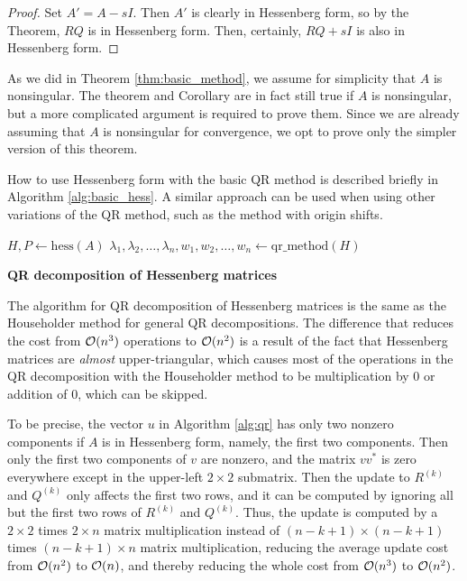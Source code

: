 \documentclass{article}
\begin{document}
\begin{proof}
	Set $A' = A -s I$. Then $A'$ is clearly in Hessenberg form, so by the Theorem, $RQ$ is in Hessenberg form. Then, certainly, $RQ +s I$ is also in Hessenberg form.
\end{proof}
\begin{remark}
	As we did in Theorem \ref{thm:basic_method}, we assume for simplicity that $A$ is nonsingular. The theorem and Corollary are in fact still true if $A$ is nonsingular, but a more complicated argument is required to prove them. Since we are already assuming that $A$ is nonsingular for convergence, we opt to prove only the simpler version of this theorem.
\end{remark}

How to use Hessenberg form with the basic QR method is described briefly in Algorithm \ref{alg:basic_hess}. A similar approach can be used when using other variations of the QR method, such as the method with origin shifts.

\begin{algorithm}[htb!]
	\caption{The Basic QR Method in Hessenberg Form}
	\label{alg:basic_hess}
	$H, P \gets \mathrm{hess}(A)$
	$\lambda_1, \lambda_2, \dots, \lambda_n, w_1, w_2,\dots, w_n \gets \mathrm{qr\_method}(H)$
\end{algorithm}

\textbf{QR decomposition of Hessenberg matrices}

The algorithm for QR decomposition of Hessenberg matrices is the same as the Householder method for general QR decompositions. The difference that reduces the cost from $\mathcal{O}(n^3)$ operations to $\mathcal{O}(n^2)$ is a result of the fact that Hessenberg matrices are \emph{almost} upper-triangular, which causes most of the operations in the QR decomposition with the Householder method to be multiplication by 0 or addition of 0, which can be skipped.

To be precise, the vector $u$ in Algorithm \ref{alg:qr} has only two nonzero components if $A$ is in Hessenberg form, namely, the first two components. Then only the first two components of $v$ are nonzero, and the matrix $vv^*$ is zero everywhere except in the upper-left $2\times 2$ submatrix. Then the update to $R^{(k)}$ and $Q^{(k)}$ only affects the first two rows, and it can be computed by ignoring all but the first two rows of $R^{(k)}$ and $Q^{(k)}$. Thus, the update is computed by a $2\times 2$ times $2 \times n$ matrix multiplication instead of $(n-k+1)\times (n-k+1)$ times $(n-k+1)\times n$ matrix multiplication, reducing the average update cost from $\mathcal{O}(n^2)$ to $\mathcal{O}(n)$, and thereby reducing the whole cost from $\mathcal{O}(n^3)$ to $\mathcal{O}(n^2)$.
\end{document}
